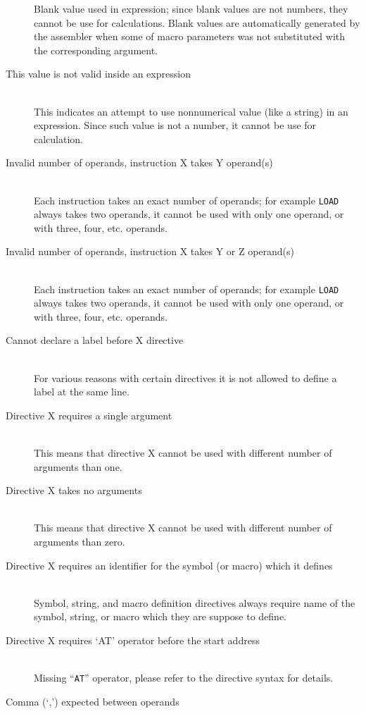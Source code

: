 \begin{description}
            Blank value used in expression; since blank values are not numbers, they cannot be use for calculations. Blank values are automatically generated by the assembler when some of macro parameters was not substituted with the corresponding argument.
        \item[This value is not valid inside an expression]~\\
            This indicates an attempt to use nonnumerical value (like a string) in an expression. Since such value is not a number, it cannot be use for calculation.
        \item[Invalid number of operands, instruction X takes Y operand(s)]~\\
            Each instruction takes an exact number of operands; for example \texttt{LOAD} always takes two operands, it cannot be used with only one operand, or with three, four, etc. operands.
        \item[Invalid number of operands, instruction X takes Y or Z operand(s)]~\\
            Each instruction takes an exact number of operands; for example \texttt{LOAD} always takes two operands, it cannot be used with only one operand, or with three, four, etc. operands.
        \item[Cannot declare a label before X directive]~\\
            For various reasons with certain directives it is not allowed to define a label at the same line.
        \item[Directive X requires a single argument]~\\
            This means that directive X cannot be used with different number of arguments than one.
        \item[Directive X takes no arguments]~\\
            This means that directive X cannot be used with different number of arguments than zero.
        \item[Directive X requires an identifier for the symbol (or macro) which it defines]~\\
            Symbol, string, and macro definition directives always require name of the symbol, string, or macro which they are suppose to define.
        \item[Directive X requires `AT' operator before the start address]~\\
            Missing ``\texttt{AT}'' operator, please refer to the directive syntax for details.
        \item[Comma (`,') expected between operands]~\\

\end{description}
